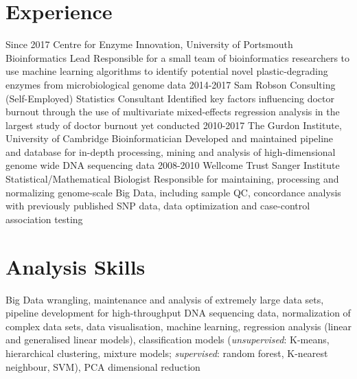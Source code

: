 \documentclass[letterpaper]{twentysecondcv} %
\begin{document}
\section{Experience}

\begin{twenty}
  \twentyitem
    {Since 2017}
    {Centre for Enzyme Innovation, University of Portsmouth}
    {Bioinformatics Lead}
    {Responsible for a small team of bioinformatics researchers to use machine learning algorithms to identify potential novel plastic-degrading enzymes from microbiological genome data}
  \twentyitem
    {2014-2017}
    {Sam Robson Consulting (Self-Employed)}
    {Statistics Consultant}
    {Identified key factors influencing doctor burnout through the use of multivariate mixed-effects regression analysis in the largest study of doctor burnout yet conducted}
\twentyitem
    {2010-2017}
    {The Gurdon Institute, University of Cambridge}
    {Bioinformatician}
    {Developed and maintained pipeline and database for in-depth processing, mining and analysis of high-dimensional genome wide DNA sequencing data}
\twentyitem
    {2008-2010}
    {Wellcome Trust Sanger Institute}
    {Statistical/Mathematical Biologist}
    {Responsible for maintaining, processing and normalizing genome-scale Big Data, including sample QC, concordance analysis with previously published SNP data, data optimization and case-control association testing}    
\end{twenty} 


\section{Analysis Skills}

Big Data wrangling, maintenance and analysis of extremely large data sets, pipeline development for high-throughput DNA sequencing data, normalization of complex data sets, data visualisation, machine learning, regression analysis (linear and generalised linear models), classification models (\emph{unsupervised}: K-means, hierarchical clustering, mixture models; \emph{supervised}: random forest, K-nearest neighbour, SVM), PCA dimensional reduction \\
\end{document}
